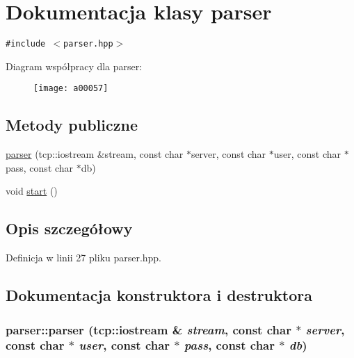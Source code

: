 \hypertarget{a00005}{
\section{Dokumentacja klasy parser}
\label{a00005}
}
{\tt \#include $<$parser.hpp$>$}

Diagram współpracy dla parser:\nopagebreak
\begin{figure}[H]
\begin{center}
\leavevmode
\texttt{[image: a00057]}
\end{center}
\end{figure}
\subsection*{Metody publiczne}
\begin{CompactItemize}
\item 
\hyperlink{a00005_3a237071a3ab764cd61bc53df9dd4f46}{parser} (tcp::iostream \&stream, const char $\ast$server, const char $\ast$user, const char $\ast$pass, const char $\ast$db)
\item 
void \hyperlink{a00005_7793913f528921aa22c4b6cc259a0a14}{start} ()
\end{CompactItemize}


\subsection{Opis szczegółowy}


Definicja w linii 27 pliku parser.hpp.

\subsection{Dokumentacja konstruktora i destruktora}
\hypertarget{a00005_3a237071a3ab764cd61bc53df9dd4f46}{
\subsubsection[{parser}]{\setlength{\rightskip}{0pt plus 5cm}parser::parser (tcp::iostream \& {\em stream}, \/  const char $\ast$ {\em server}, \/  const char $\ast$ {\em user}, \/  const char $\ast$ {\em pass}, \/  const char $\ast$ {\em db})}}
\label{a00005_3a237071a3ab764cd61bc53df9dd4f46}




